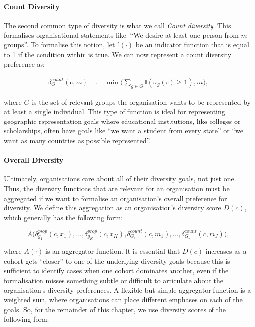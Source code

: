 \paragraph{Count Diversity} The second common type of diversity is what we call \emph{Count diversity}. This formalises organisational statements like: ``We desire at least one person from $m$ groups''. To formalise this notion, let $\mathbb{I}(\cdot)$ be an indicator function that is equal to 1 if the condition within is true. We can now represent a count diversity preference as:

\begin{equation} 
    \begin{split}
        \delta_G^{count}(c,m) &:= \min\big(\sum_{g \in G}\mathbb{I}(\sigma_g(c)\geq 1), m\big), \label{eq:count_div_function}
    \end{split}
\end{equation}

\noindent where $G$ is the set of relevant groups the organisation wants to be represented by at least a single individual. This type of function is ideal for representing geographic representation goals where educational institutions, like colleges or scholarships, often have goals like ``we want a student from every state'' or ``we want as many countries as possible represented''. 

\paragraph{Overall Diversity} Ultimately, organisations care about all of their diversity goals, not just one. Thus, the diversity functions that are relevant for an organisation must be aggregated if we want to formalise an organisation's overall preference for diversity. We define this aggregation as an organisation's diversity score $D(c)$, which generally has the following form: 

\begin{equation}
A\big(\delta_{g_1}^{prop}(c,x_1),...,\delta_{g_K}^{prop}(c,x_K),\delta_{G_1}^{count}(c, m_1),...,\delta_{G_J}^{count}(c, m_J)\big), \nonumber
\end{equation}

\noindent where $A(\cdot)$ is an aggregator function. It is essential that $D(c)$ increases as a cohort gets ``closer'' to one of the underlying diversity goals because this is sufficient to identify cases when one cohort dominates another, even if the formalisation misses something subtle or difficult to articulate about the organisation's diversity preferences. A flexible but simple aggregator function is a weighted sum, where organisations can place different emphases on each of the goals. So, for the remainder of this chapter, we use diversity scores of the following form: 


